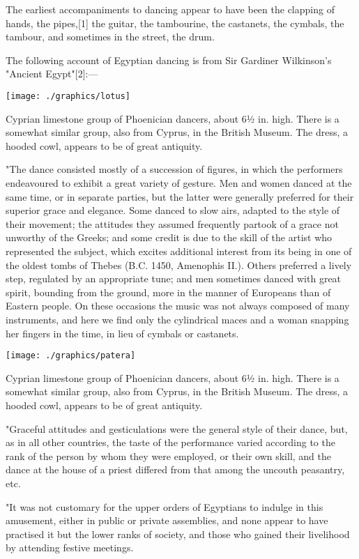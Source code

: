 The earliest accompaniments to dancing appear to have been the clapping of hands, the pipes,[1] the guitar, the tambourine, the castanets, the cymbals, the tambour, and sometimes in the street, the drum.

The following account of Egyptian dancing is from Sir Gardiner Wilkinson's "Ancient Egypt"[2]:—
\begin{marginfigure}
   \texttt{[image: ./graphics/lotus]} 
   \caption{\small Cyprian limestone group of Phoenician dancers, about 6½ in. high. There is a somewhat similar group, also from Cyprus, in the British Museum. The dress, a hooded cowl, appears to be of great antiquity.}
\end{marginfigure}
"The dance consisted mostly of a succession of figures, in which the performers endeavoured to exhibit a great variety of gesture. Men and women danced at the same time, or in separate parties, but the latter were generally preferred for their superior grace and elegance. Some danced to slow airs, adapted to the style of their movement; the attitudes they assumed frequently partook of a grace not unworthy of the Greeks; and some credit is due to the skill of the artist who represented the subject, which excites additional interest from its being in one of the oldest tombs of Thebes (B.C. 1450, Amenophis II.). Others preferred a lively step, regulated by an appropriate tune; and men sometimes danced with great spirit, bounding from the ground, more in the manner of Europeans than of Eastern people. On these occasions the music was not always composed of many instruments, and here we find only the cylindrical maces and a woman snapping her fingers in the time, in lieu of cymbals or castanets.
\begin{marginfigure}
   \texttt{[image: ./graphics/patera]} 
   \caption{\small Cyprian limestone group of Phoenician dancers, about 6½ in. high. There is a somewhat similar group, also from Cyprus, in the British Museum. The dress, a hooded cowl, appears to be of great antiquity.}
\end{marginfigure}
"Graceful attitudes and gesticulations were the general style of their dance, but, as in all other countries, the taste of the performance varied according to the rank of the person by whom they were employed, or their own skill, and the dance at the house of a priest differed from that among the uncouth peasantry, etc.

"It was not customary for the upper orders of Egyptians to indulge in this amusement, either in public or private assemblies, and none appear to have practised it but the lower ranks of society, and those who gained their livelihood by attending festive meetings.

